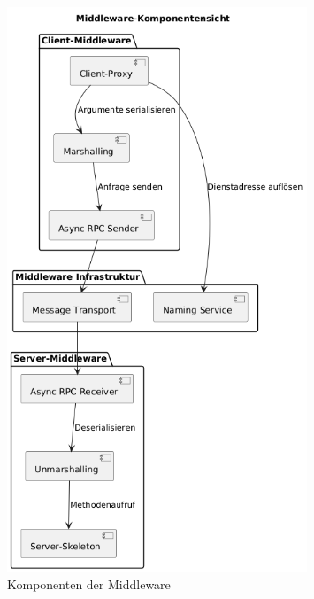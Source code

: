 \begin{figure}[htbp!]
	\centering
	\includegraphics[width=0.8\textwidth]{diagrams/bausteinsicht.png}
	\caption{Komponenten der Middleware}
	\label{fig:meine-abbildung}
\end{figure}